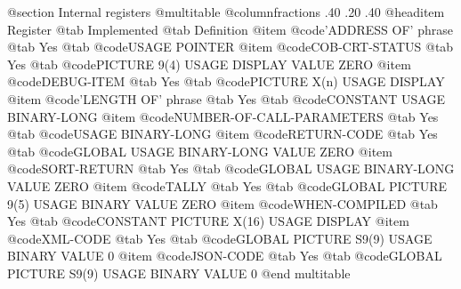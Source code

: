 @section Internal registers
@multitable @columnfractions .40 .20 .40
@headitem Register @tab Implemented @tab Definition
@item @code{'ADDRESS OF' phrase} @tab Yes @tab @code{USAGE POINTER}
@item @code{COB-CRT-STATUS} @tab Yes @tab @code{PICTURE 9(4) USAGE DISPLAY VALUE ZERO}
@item @code{DEBUG-ITEM} @tab Yes @tab @code{PICTURE X(n) USAGE DISPLAY}
@item @code{'LENGTH OF' phrase} @tab Yes @tab @code{CONSTANT USAGE BINARY-LONG}
@item @code{NUMBER-OF-CALL-PARAMETERS} @tab Yes @tab @code{USAGE BINARY-LONG}
@item @code{RETURN-CODE} @tab Yes @tab @code{GLOBAL USAGE BINARY-LONG VALUE ZERO}
@item @code{SORT-RETURN} @tab Yes @tab @code{GLOBAL USAGE BINARY-LONG VALUE ZERO}
@item @code{TALLY} @tab Yes @tab @code{GLOBAL PICTURE 9(5) USAGE BINARY VALUE ZERO}
@item @code{WHEN-COMPILED} @tab Yes @tab @code{CONSTANT PICTURE X(16) USAGE DISPLAY}
@item @code{XML-CODE} @tab Yes @tab @code{GLOBAL PICTURE S9(9) USAGE BINARY VALUE 0}
@item @code{JSON-CODE} @tab Yes @tab @code{GLOBAL PICTURE S9(9) USAGE BINARY VALUE 0}
@end multitable
